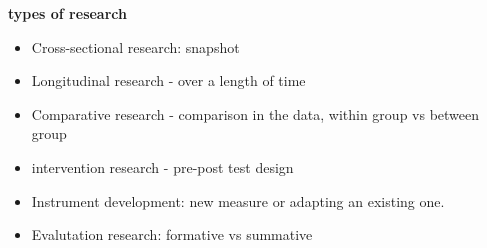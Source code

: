 \documentclass{TC}
\begin{document}
\textbf{types of research}
\begin{itemize}
\item Cross-sectional research: snapshot
\item Longitudinal research - over a length of time
\item Comparative research - comparison in the data, within group vs between group
\item intervention research - pre-post test design
\item Instrument development: new measure or adapting an existing one.
\item Evalutation research: formative vs summative  
\end{itemize}
\end{document}
